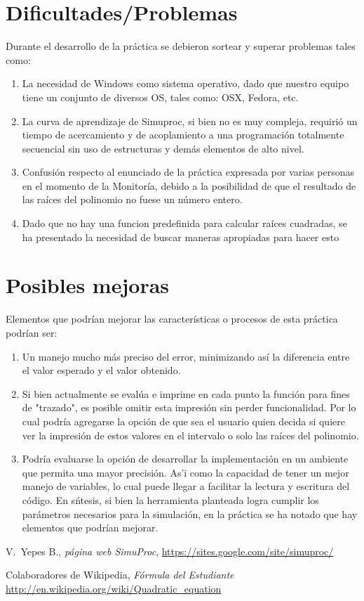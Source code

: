 \documentclass[12pt,journal,compsoc]{IEEEtran}
\begin{document}
\section{Dificultades/Problemas}
Durante el desarrollo de la pr\'actica se debieron sortear y superar problemas tales como:
\begin{enumerate}
\item La necesidad de Windows como sistema operativo, dado
    que nuestro equipo tiene un conjunto de diversos OS, tales
    como: OSX, Fedora, etc.
    \item La curva de aprendizaje de Simuproc, si bien no es muy compleja,
    requiri\'o un tiempo de acercamiento y de acoplamiento a una programaci\'on
    totalmente secuencial sin uso de estructuras y dem\'as elementos
    de alto nivel. 
    \item Confusi\'on respecto al enunciado de la pr\'actica expresada por
    varias personas en el momento de la Monitor\'ia, debido a la posibilidad
    de que el resultado de las ra\'ices del polinomio no fuese un n\'umero
    entero.
    \item Dado que no hay una funcion predefinida
para calcular ra\'ices cuadradas, se ha presentado la necesidad de buscar maneras apropiadas para hacer esto

\end{enumerate}

\section{Posibles mejoras}
Elementos que podr\'ian mejorar las caracter\'isticas o procesos de esta pr\'actica podr\'ian ser:
\begin{enumerate}
	\item Un manejo mucho m\'as preciso del error, minimizando as\'i la diferencia entre el valor esperado y el valor obtenido.
    \item Si bien actualmente se eval\'ua e imprime en cada punto la funci\'on para fines de "trazado", es posible omitir esta impresi\'on sin perder funcionalidad. Por lo cual podr\'ia agregarse la opci\'on de que sea el usuario quien decida si quiere ver la impresi\'on de estos valores en el intervalo o solo las ra\'ices del polinomio.
    \item Podr\'ia evaluarse la opci\'on de desarrollar la implementaci\'on en un ambiente que permita una mayor precisi\'on. As'i como la capacidad de tener un mejor manejo de variables, lo cual puede llegar a facilitar la lectura y escritura del c\'odigo. En s\'ntesis, si bien la herramienta planteada logra cumplir los parámetros necesarios para la simulaci\'on, en la práctica se ha notado que hay elementos que podrían mejorar.

\end{enumerate}

\begin{thebibliography}{2}

V.~Yepes B., \emph{p\'agina web SimuProc}, 
\url{https://sites.google.com/site/simuproc/}

Colaboradores de Wikipedia, \emph{F\'ormula del Estudiante}
\url{http://en.wikipedia.org/wiki/Quadratic_equation}


\end{thebibliography}
\end{document}
